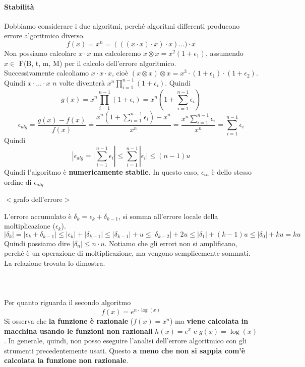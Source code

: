 \documentclass[10pt]{book}
\begin{document}
\paragraph{Stabilità} Dobbiamo considerare i due algoritmi, perché algoritmi differenti producono errore algoritmico diverso. $$f(x) = x^n = (((x\cdot x)\cdot x)\cdot x) \ldots)\cdot x$$ Non possiamo calcolare $x \cdot x$ ma calcoleremo $x \otimes x = x^2(1 + \epsilon_1)$, assumendo $x \in$ F(B, t, m, M) per il calcolo dell'errore algoritmico.\\
Successivamente calcoliamo $x\cdot x\cdot x$, cioè $(x \otimes x) \otimes x = x^3 \cdot (1 + \epsilon_1) \cdot (1 + \epsilon_2)$.\\
Quindi $x\cdot \ldots \cdot x$ $n$ volte diventerà $x^n \prod_{i = 1}^{n-1}(1 + \epsilon_i)$. Quindi $$g(x) =  x^n \prod_{i = 1}^{n-1}(1 + \epsilon_i) = x^n(1 + \sum_{i = 1}^{n - 1}\epsilon_i)$$
$$\epsilon_{alg} = \frac{g(x) - f(x)}{f(x)} \doteq \frac{x^n(1 + \sum_{i = 1}^{n - 1}\epsilon_i) - x^n}{x^n} = \frac{x^n\sum_{i = 1}^{n - 1}\epsilon_i}{x^n} = \sum_{i = 1}^{n - 1}\epsilon_i$$
Quindi $$|\epsilon_{alg} = |\sum_{i = 1}^{n - 1}\epsilon_i| \leq \sum_{i = 1}^{n - 1}|\epsilon_i| \leq (n - 1)u$$ Quindi l'algoritmo è \textbf{numericamente stabile}. In questo caso, $\epsilon_{in}$ è dello stesso ordine di $\epsilon_{alg}$
\begin{center}
	$<$grafo dell'errore$>$
\end{center}
L'errore accumulato è $\delta_k = \epsilon_k + \delta_{k - 1}$, si somma all'errore locale della moltiplicazione ($\epsilon_k$). $$|\delta_k| = |\epsilon_k + \delta_{k - 1}| \leq |\epsilon_k| + |\delta_{k - 1}| \leq |\delta_{k - 1}| + u \leq |\delta_{k - 2}| + 2u \leq |\delta_1| + (k - 1)u \leq |\delta_0| + ku = ku$$ Quindi possiamo dire $|\delta_n| \leq n\cdot u$. Notiamo che gli errori non si amplificano, perché è un operazione di moltiplicazione, ma vengono semplicemente sommati. La relazione trovata lo dimostra.\\\\\\\\
Per quanto riguarda il secondo algoritmo $$f(x) = e^{n\cdot\log(x)}$$ Si osserva che \textbf{la funzione è razionale} ($f(x) = x^n$) ma \textbf{viene calcolata in macchina usando le funzioni non razionali} $h(x) = e^x$ e $g(x) = \log(x)$. In generale, quindi, non posso eseguire l'analisi dell'errore algoritmico con gli strumenti precedentemente usati. Questo \textbf{a meno che non si sappia com'è calcolata la funzione non razionale}.\\
\end{document}
